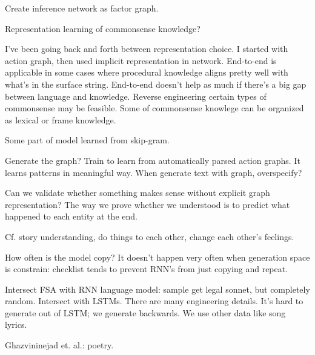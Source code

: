 Create inference network as factor graph. 

Representation learning of commonsense knowledge?

I've been going back and forth between representation choice. I started with action graph, then used implicit representation in network. End-to-end is applicable in some cases where procedural knowledge aligns pretty well with what's in the surface string. End-to-end doesn't help  as much if there's a big gap between language and knowledge.
Reverse engineering certain types of commonsense may be feasible. Some of commonsense knowlege can be organized as lexical or frame knowledge.

Some part of model learned from skip-gram.

Generate the graph? 
Train to learn from automatically parsed action graphs. It learns patterns in meaningful way. When generate text with graph, overspecify? 

Can we validate whether something makes sense without explicit graph representation?
The way we prove whether we understood is to predict what happened to each entity at the end.

Cf. story understanding, do things to each other, change each other's feelings.

How often is the model copy? It doesn't happen very often when generation space is constrain: checklist tends to prevent RNN's from just copying and repeat. %

Intersect FSA with RNN language model: sample get legal sonnet, but completely random. Intersect with LSTMs. There are many engineering details. It's hard to generate out of LSTM; we generate backwards. We use other data like song lyrics.

Ghazvininejad et. al.: poetry.